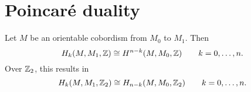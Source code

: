 \section{Poincaré duality}

\begin{theorem}
    Let $M$ be an orientable cobordism from  $M_0$ to $M_1$.
    Then
    \[
        H_k(M, M_1, \mathbb{Z}) \cong H^{n-k}(M,M_0, \mathbb{Z}) \qquad k = 0, \ldots, n
    .\] 
    Over $\mathbb{Z}_2$, this results in
    \[
        H_k(M, M_1, \mathbb{Z}_2) \cong H_{n-k}(M,M_0, \mathbb{Z}_2) \qquad k = 0, \ldots, n
    .\] 
\end{theorem}
